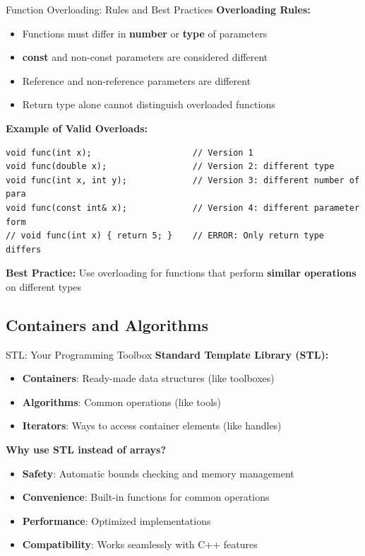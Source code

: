 \begin{frame}[fragile]{Function Overloading: Rules and Best Practices}
	\textbf{Overloading Rules:}
	\begin{itemize}
		\item Functions must differ in \textbf{number} or \textbf{type} of parameters
		\item \textbf{const} and non-const parameters are considered different
		\item Reference and non-reference parameters are different
		\item Return type alone cannot distinguish overloaded functions
	\end{itemize}

	\textbf{Example of Valid Overloads:}
	\begin{verbatim}
void func(int x);                    // Version 1
void func(double x);                 // Version 2: different type
void func(int x, int y);             // Version 3: different number of para
void func(const int& x);             // Version 4: different parameter form
// void func(int x) { return 5; }    // ERROR: Only return type differs
    \end{verbatim}

	\textbf{Best Practice:} Use overloading for functions that perform \textbf{similar operations} on different types
\end{frame}

\subsection{Containers and Algorithms}
\begin{frame}[fragile]{STL: Your Programming Toolbox}
	\textbf{Standard Template Library (STL):}
	\begin{itemize}
		\item \textbf{Containers}: Ready-made data structures (like toolboxes)
		\item \textbf{Algorithms}: Common operations (like tools)
		\item \textbf{Iterators}: Ways to access container elements (like handles)
	\end{itemize}

	\vspace{0.5em}
	\textbf{Why use STL instead of arrays?}
	\begin{itemize}
		\item \textbf{Safety}: Automatic bounds checking and memory management
		\item \textbf{Convenience}: Built-in functions for common operations
		\item \textbf{Performance}: Optimized implementations
		\item \textbf{Compatibility}: Works seamlessly with C++ features
	\end{itemize}
\end{frame}


